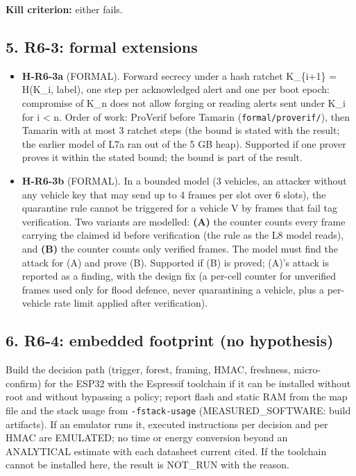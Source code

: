 \textbf{Kill criterion:} either fails.

\subsection*{5. R6-3: formal extensions}

\begin{itemize}
\item \textbf{H-R6-3a} (FORMAL). Forward secrecy under a hash ratchet K\_\{i+1\} = H(K\_i, label), one step per acknowledged alert and one per boot epoch: compromise of K\_n does not allow forging or reading alerts sent under K\_i for i < n. Order of work: ProVerif before Tamarin (\texttt{formal/proverif/}), then Tamarin with at most 3 ratchet steps (the bound is stated with the result; the earlier model of L7a ran out of the 5 GB heap). Supported if one prover proves it within the stated bound; the bound is part of the result.
\item \textbf{H-R6-3b} (FORMAL). In a bounded model (3 vehicles, an attacker without any vehicle key that may send up to 4 frames per slot over 6 slots), the quarantine rule cannot be triggered for a vehicle V by frames that fail tag verification. Two variants are modelled: \textbf{(A)} the counter counts every frame carrying the claimed id before verification (the rule as the L8 model reads), and \textbf{(B)} the counter counts only verified frames. The model must find the attack for (A) and prove (B). Supported if (B) is proved; (A)'s attack is reported as a finding, with the design fix (a per-cell counter for unverified frames used only for flood defence, never quarantining a vehicle, plus a per-vehicle rate limit applied after verification).
\end{itemize}

\subsection*{6. R6-4: embedded footprint (no hypothesis)}

Build the decision path (trigger, forest, framing, HMAC, freshness, micro-confirm) for the ESP32 with the Espressif toolchain if it can be installed without root and without bypassing a policy; report flash and static RAM from the map file and the stack usage from \texttt{-fstack-usage} (MEASURED\_SOFTWARE: build artifacts). If an emulator runs it, executed instructions per decision and per HMAC are EMULATED; no time or energy conversion beyond an ANALYTICAL estimate with each datasheet current cited. If the toolchain cannot be installed here, the result is NOT\_RUN with the reason.

